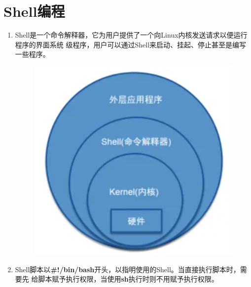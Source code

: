 \documentclass[11pt]{article}
\begin{document}
\section{Shell编程}
\begin{enumerate}
    \item Shell是一个命令解释器，它为用户提供了一个向Linux内核发送请求以便运行程序的界面系统
    级程序，用户可以通过Shell来启动、挂起、停止甚至是编写一些程序。
    \begin{figure}[htb]
        \centering
        \includegraphics[scale=0.3]{imgs/shell.png}
    \end{figure}
    \item Shell脚本以\textbf{\#!/bin/bash}开头，以指明使用的Shell。当直接执行脚本时，需要先
    给脚本赋予执行权限，当使用\textbf{sh}执行时则不用赋予执行权限。
\end{enumerate}

















    
\end{document}
